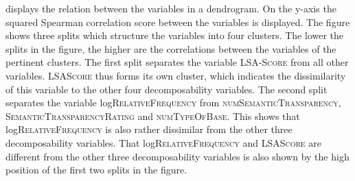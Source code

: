  
 \begin{table}

	\caption{Correlation matrix for decomposability measures in corpus study}
	\label{tab: Correlation matrix for all decomposability measures in corpus study}
	

 \end{table}
 
 
 


 

 
   displays the relation between the variables in a dendrogram. On the y-axis the squared Spearman correlation score between the variables is displayed. 
  The figure shows three splits which structure the variables into four clusters. The lower the splits in the figure, the higher are the correlations between the variables of the pertinent clusters.
      The first split separates the  variable \textsc{LSA-Score} from all other variables. \textsc{LSAScore} thus forms its own cluster, which indicates the dissimilarity of this variable to the other four decomposability variables. The second split separates the variable log\textsc{RelativeFrequency} from \textsc{numSemanticTransparency}, \textsc{SemanticTransparencyRating} and \textsc{numTypeOfBase}. This shows that log\textsc{RelativeFrequency} is also rather dissimilar from the other three decomposability variables. 
      That log\textsc{RelativeFrequency} and \textsc{LSAScore} are different from the other three decomposability variables is also shown by the high position of the first two splits in the figure.
      
